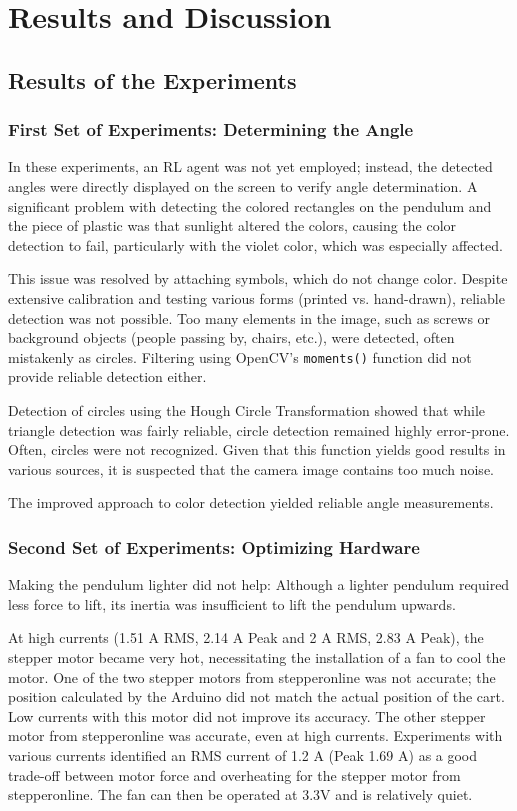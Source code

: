 \chapter{Results and Discussion}

\section{Results of the Experiments}

\subsection{First Set of Experiments: Determining the Angle}
In these experiments, an RL agent was not yet employed; instead, the detected angles were directly displayed on the screen to verify angle determination. A significant problem with detecting the colored rectangles on the pendulum and the piece of plastic was that sunlight altered the colors, causing the color detection to fail, particularly with the violet color, which was especially affected.

This issue was resolved by attaching symbols, which do not change color. Despite extensive calibration and testing various forms (printed vs. hand-drawn), reliable detection was not possible. Too many elements in the image, such as screws or background objects (people passing by, chairs, etc.), were detected, often mistakenly as circles. Filtering using OpenCV's \texttt{moments()} function did not provide reliable detection either.

Detection of circles using the Hough Circle Transformation showed that while triangle detection was fairly reliable, circle detection remained highly error-prone. Often, circles were not recognized. Given that this function yields good results in various sources, it is suspected that the camera image contains too much noise.

The improved approach to color detection yielded reliable angle measurements.

\subsection{Second Set of Experiments: Optimizing Hardware}
Making the pendulum lighter did not help: Although a lighter pendulum required less force to lift, its inertia was insufficient to lift the pendulum upwards.

At high currents (1.51 A RMS, 2.14 A Peak and 2 A RMS, 2.83 A Peak), the stepper motor became very hot, necessitating the installation of a fan to cool the motor. One of the two stepper motors from stepperonline was not accurate; the position calculated by the Arduino did not match the actual position of the cart. Low currents with this motor did not improve its accuracy. The other stepper motor from stepperonline was accurate, even at high currents. Experiments with various currents identified an RMS current of 1.2 A (Peak 1.69 A) as a good trade-off between motor force and overheating for the stepper motor from stepperonline. The fan can then be operated at 3.3V and is relatively quiet.

